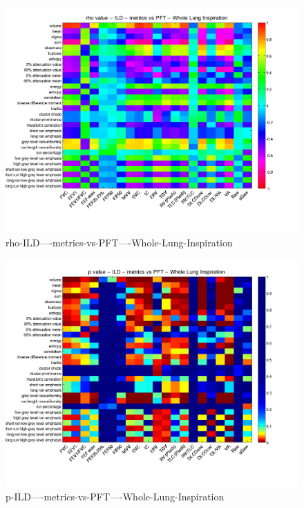 \documentclass[12pt]{article}
\begin{document}
\begin{figure}
        \includegraphics[width=0.84\linewidth,viewport=100 60 620 550]{corr/rho-ILD----metrics-vs-PFT----Whole-Lung-Inspiration.png}
    \caption{rho-ILD----metrics-vs-PFT----Whole-Lung-Inspiration}
    \label{fig:rho-ILD----metrics-vs-PFT----Whole-Lung-Inspiration}
\end{figure}
\begin{figure}
    \includegraphics[width=0.84\linewidth,viewport=100 60 620 550]{corr/p-ILD----metrics-vs-PFT----Whole-Lung-Inspiration.png}
    \caption{p-ILD----metrics-vs-PFT----Whole-Lung-Inspiration}
    \label{fig:p-ILD----metrics-vs-PFT----Whole-Lung-Inspiration}
\end{figure}
\end{document}
